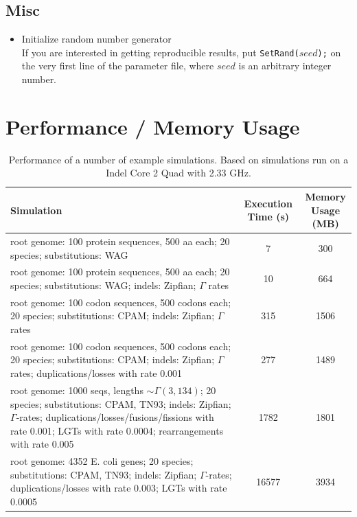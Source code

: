 \documentclass[11pt]{article}
\begin{document}
\subsection{Misc}
\begin{itemize}
\item{Initialize random number generator} \hfill \\
If you are interested in getting reproducible results, put \texttt{SetRand(}$seed$\texttt{);} on the very first line of the parameter file, where $seed$ is an arbitrary integer number.
\end{itemize}

\section{Performance / Memory Usage}

\begin{table}[htp]
\begin{center}
\begin{footnotesize}
\begin{tabular}{lcc}
\hline
\bf{Simulation}            & \parbox{2cm}{\bf{Execution Time (s)}}        & \parbox{2.0cm}{\bf{Memory\\ Usage (MB)}} \\
\hline
\parbox{7.3cm}{root genome: 100 protein sequences, 500 aa each; 20 species; substitutions: WAG} & 7 & 300 \\
\hline
\parbox{7.3cm}{root genome: 100 protein sequences, 500 aa each; 20 species; substitutions: WAG; indels: Zipfian; $\Gamma$ rates} & 10 & 664 \\
\hline
\parbox{7.3cm}{root genome: 100 codon sequences, 500 codons each; 20 species; substitutions: CPAM; indels: Zipfian; $\Gamma$ rates} & 315 & 1506 \\
\hline
\parbox{7.3cm}{root genome: 100 codon sequences, 500 codons each; 20 species; substitutions: CPAM; indels: Zipfian; $\Gamma$ rates; duplications/losses with rate 0.001} & 277 & 1489 \\
\hline
\parbox{7.3cm}{root genome: 1000 seqs, lengths $\sim\Gamma(3,134)$; 20 species; substitutions: CPAM, TN93; indels: Zipfian; $\Gamma$-rates; duplications/losses/fusions/fissions with rate 0.001; LGTs with rate 0.0004; rearrangements with rate 0.005} & 1782 & 1801 \\
\hline
\parbox{7.3cm}{root genome: 4352 E. coli genes; 20 species; substitutions: CPAM, TN93; indels: Zipfian; $\Gamma$-rates; duplications/losses with rate 0.003; LGTs with rate 0.0005} & 16577 & 3934 \\

\hline
\end{tabular}
\end{footnotesize} %
\end{center}
\caption{Performance of a number of example simulations. Based on simulations run on a Indel Core 2 Quad with 2.33 GHz.}
\label{tab.performance}
\end{table}




\end{document}
